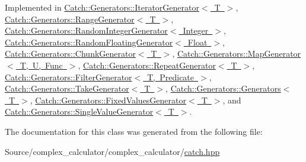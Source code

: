 Implemented in \mbox{\hyperlink{class_catch_1_1_generators_1_1_iterator_generator_acafb4fa1eebe5e1db571621a35a3f137}{Catch\+::\+Generators\+::\+Iterator\+Generator$<$ T $>$}}, \mbox{\hyperlink{class_catch_1_1_generators_1_1_range_generator_a4e6b2038832f09724d5a4355b4691259}{Catch\+::\+Generators\+::\+Range\+Generator$<$ T $>$}}, \mbox{\hyperlink{class_catch_1_1_generators_1_1_random_integer_generator_aaa3db70fbdfa3e8dcb61fb5592eba81f}{Catch\+::\+Generators\+::\+Random\+Integer\+Generator$<$ Integer $>$}}, \mbox{\hyperlink{class_catch_1_1_generators_1_1_random_floating_generator_a6a65e5f16abd884f58c31581b2a0d6db}{Catch\+::\+Generators\+::\+Random\+Floating\+Generator$<$ Float $>$}}, \mbox{\hyperlink{class_catch_1_1_generators_1_1_chunk_generator_a545e89f80eb1e3c953491541ea083f86}{Catch\+::\+Generators\+::\+Chunk\+Generator$<$ T $>$}}, \mbox{\hyperlink{class_catch_1_1_generators_1_1_map_generator_aa07e2f12d38ae060c30cc30d9dc236c5}{Catch\+::\+Generators\+::\+Map\+Generator$<$ T, U, Func $>$}}, \mbox{\hyperlink{class_catch_1_1_generators_1_1_repeat_generator_a24d5c2b1c09d6d220d4bd4c83f222dcb}{Catch\+::\+Generators\+::\+Repeat\+Generator$<$ T $>$}}, \mbox{\hyperlink{class_catch_1_1_generators_1_1_filter_generator_a02ce0839dcaa7545c55d0fe70cc50e84}{Catch\+::\+Generators\+::\+Filter\+Generator$<$ T, Predicate $>$}}, \mbox{\hyperlink{class_catch_1_1_generators_1_1_take_generator_ae343f3e28fe04e0a20d6fdf69bfb4c78}{Catch\+::\+Generators\+::\+Take\+Generator$<$ T $>$}}, \mbox{\hyperlink{class_catch_1_1_generators_1_1_generators_ad127fd2a07347b527f79ab3b78bd40fb}{Catch\+::\+Generators\+::\+Generators$<$ T $>$}}, \mbox{\hyperlink{class_catch_1_1_generators_1_1_fixed_values_generator_a6ce9e3ed045239c7b82873f24bd9cd3b}{Catch\+::\+Generators\+::\+Fixed\+Values\+Generator$<$ T $>$}}, and \mbox{\hyperlink{class_catch_1_1_generators_1_1_single_value_generator_a10833b34e3ccbc484624185712eb8b6e}{Catch\+::\+Generators\+::\+Single\+Value\+Generator$<$ T $>$}}.



The documentation for this class was generated from the following file\+:\begin{DoxyCompactItemize}
\item 
Source/complex\+\_\+calculator/complex\+\_\+calculator/\mbox{\hyperlink{catch_8hpp}{catch.\+hpp}}\end{DoxyCompactItemize}
